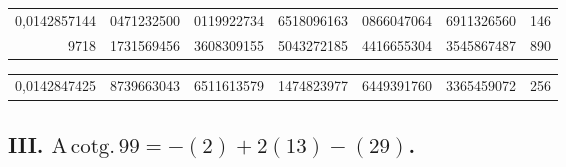 \documentclass[10pt,a4paper]{article}
\begin{document}
\medskip

\begin{center}
\begin{tabular}{r r r r r r}
0,0142857144 & 0471232500 & 0119922734 & 6518096163 & 0866047064 & 6911326560 & 146 \\
9718 & 1731569456 & 3608309155 & 5043272185 & 4416655304 & 3545867487 & 890 \\
\end{tabular}
\end{center}

\medskip

\begin{center}
\begin{tabular}{r r r r r r}
0,0142847425 & 8739663043 & 6511613579 & 1474823977 & 6449391760 & 3365459072 & 256 \\
\end{tabular}
\end{center}

\newpage

\subsection*{III. $\mathrm{A\,cotg.}\,99 = -(2) + 2(13) - (29)$.}
\end{document}
